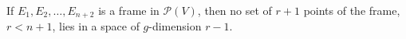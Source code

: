 If $E_1, E_2, \dots, E_{n+2}$ is a frame in $\mathcal{P}(V)$, then no set of $r+1$ points of the frame, $r < n+1$, lies in a space of $g$-dimension $r-1$.
